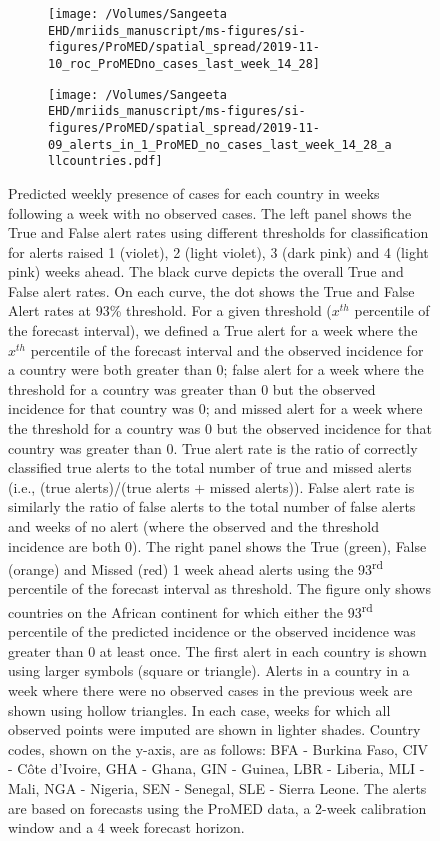 \documentclass[9pt,twoside,lineno]{pnas-new}
\begin{document}
\begin{figure}
\centering
\begin{subfigure}[b]{0.45\textwidth}
\texttt{[image: /Volumes/Sangeeta EHD/mriids\_manuscript/ms-figures/si-figures/ProMED/spatial\_spread/2019-11-10\_roc\_ProMEDno\_cases\_last\_week\_14\_28]}
\end{subfigure}
\begin{subfigure}[b]{0.45\textwidth}
\texttt{[image: /Volumes/Sangeeta EHD/mriids\_manuscript/ms-figures/si-figures/ProMED/spatial\_spread/2019-11-09\_alerts\_in\_1\_ProMED\_no\_cases\_last\_week\_14\_28\_allcountries.pdf]}
\end{subfigure}
\caption{Predicted weekly presence of cases for each 
country in weeks following a week with no observed cases. 
The left panel shows the True and False alert rates using
different thresholds for classification for alerts raised 1 (violet), 2
(light violet), 3 (dark pink) and 4 (light pink) weeks ahead. The
black curve depicts the overall True and False alert rates. On each
curve, the dot shows the True and False Alert rates at 93\% threshold.
For a given threshold (\(x^{th}\)
percentile of the forecast interval), we defined a True alert for a week
where the \(x^{th}\) percentile of the forecast interval and the
observed incidence for a country were both greater than 0; false alert
for a week where the threshold for a country was greater than 0 but the
observed incidence for that country was 0; and missed alert for a week where
the threshold for a country was 0 but the observed incidence for that
country was greater than 0. True alert rate is the ratio of correctly
classified true alerts to the total number of true and missed alerts
(i.e., (true alerts)/(true alerts + missed alerts)). False alert rate is
similarly the ratio of false alerts to the total number of false alerts
and weeks of no alert (where the observed and the threshold incidence
are both 0). The right panel shows the True (green), False (orange) and
Missed (red) 1 week ahead alerts using the 93\textsuperscript{rd} percentile of the
forecast interval as threshold. 
The figure only shows countries on the
African continent for which either the 93\textsuperscript{rd}
percentile of the predicted incidence or the
observed incidence was greater than 0 at least once. 
The first alert in each country is shown
using larger symbols (square or triangle). Alerts in a country in a
week where there were no observed cases in the previous week are shown
using hollow triangles. In each case, weeks for which all observed points
were imputed are shown in lighter shades.
Country codes, shown on the y-axis, are as
follows: BFA - Burkina Faso, CIV - Côte d'Ivoire,
GHA - Ghana, GIN - Guinea, LBR - Liberia, MLI - Mali, NGA - Nigeria,
SEN - Senegal, SLE - Sierra Leone. The alerts are based on forecasts 
using the ProMED data, a 2-week calibration window and a 4 week
forecast horizon.}
\label{fig:rocnocases}
\end{figure}\FloatBarrier
\end{document}
